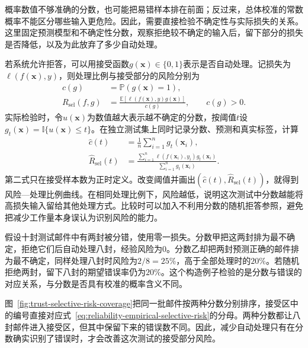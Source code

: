 概率数值不够准确的分数，也可能把易错样本排在前面；反过来，总体校准的常数概率不能区分哪些输入更危险。因此，需要直接检验不确定性与实际损失的关系。这里固定预测模型和不确定性分数，观察拒绝较不确定的输入后，留下部分的损失是否降低，以及为此放弃了多少自动处理。

若系统允许拒答，可以用接受函数$g(\bm{x})\in\{0,1\}$表示是否自动处理。记损失为$\ell(f(\bm{x}),y)$，则处理比例与接受部分的风险分别为
\begin{equation}
 \begin{aligned}
 c(g)&=\mathbb P(g(\bm{x})=1),\\
 R_{\mathrm{sel}}(f,g)
 &=\frac{\mathbb E[\ell(f(\bm{x}),y)g(\bm{x})]}
         {c(g)},\qquad c(g)>0.
 \end{aligned}
 \label{eq:reliability-selective-risk}
\end{equation}
实际检验时，令$u(\bm{x})$为数值越大表示越不确定的分数，按阈值$t$设$g_t(\bm{x})=\mathbb I\{u(\bm{x})\leq t\}$。在独立测试集上同时记录分数、预测和真实标签，计算
\begin{equation}
 \begin{aligned}
 \hat c(t)&=\frac1n\sum_{i=1}^{n}g_t(\bm{x}_i),\\
 \hat R_{\mathrm{sel}}(t)
 &=\frac{\sum_{i=1}^{n}\ell(f(\bm{x}_i),y_i)g_t(\bm{x}_i)}
          {\sum_{i=1}^{n}g_t(\bm{x}_i)}.
 \end{aligned}
 \label{eq:reliability-empirical-selective-risk}
\end{equation}
第二式只在接受样本数为正时定义。改变阈值并画出$(\hat c(t),\hat R_{\mathrm{sel}}(t))$，就得到风险—处理比例曲线。在相同处理比例下，风险越低，说明这次测试中分数越能将高损失输入留给其他处理方式。比较时可以加入不利用分数的随机拒答参照，避免把减少工作量本身误认为识别风险的能力。

\begin{example}[相同拒答比例下的不同效果]
\label{ex:reliability-risk-ranking}
假设十封测试邮件中有两封被分错，使用零一损失。分数甲把这两封排为最不确定，拒绝它们后自动处理八封，经验风险为0。分数乙却把两封预测正确的邮件排为最不确定，同样处理八封时风险为$2/8=25\%$，高于全部处理时的$20\%$。若随机拒绝两封，留下八封的期望错误率仍为$20\%$。这个构造例子检验的是分数与错误的对应关系，与分数是否具有校准的概率含义不同。
\end{example}

图~\ref{fig:trust-selective-risk-coverage}把同一批邮件按两种分数分别排序，接受区中的编号直接对应式~\eqref{eq:reliability-empirical-selective-risk}的分母。两种分数都让八封邮件进入接受区，但其中保留下来的错误数不同。因此，减少自动处理只有在分数确实识别了错误时，才会改善这次测试的接受部分风险。

